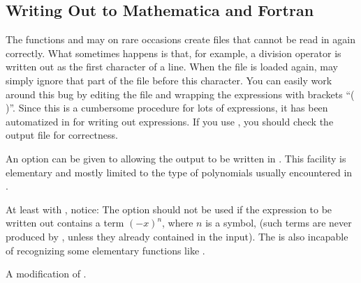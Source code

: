 \subsection{Writing Out to Mathematica and Fortran%
}
\label{write2}

The \mma functions  and  may on rare occasions create files
that cannot  be read in again correctly. What sometimes happens is that, for
example, a division operator is written out as the first character of a line.
When the file is loaded again, \mma may simply ignore that part  of the file
before this character.
You can easily work around this bug
by editing the file and wrapping
the expressions with brackets ``( )''. Since this is a cumbersome
procedure for lots of expressions, it has been automatized in
 for writing out expressions.
If you use , you should check
the output file for correctness.

An option can be given to  allowing the
output to be written in 
. This facility is elementary and mostly limited to the
type of polynomials usually encountered in \fc.

At least with , notice:
The  option should not be used if the expression to be
written out contains a term $(-x)^n$, where $n$ is a symbol, (such terms are never
produced by \fc, unless they already contained in the input).
The \mma {} is also incapable of recognizing some elementary
functions like .

 {A modification of .}

